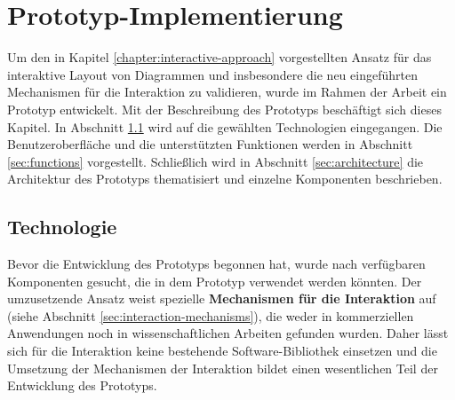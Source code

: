 
\chapter{Prototyp-Implementierung}
\label{chapter:prototype}

Um den in Kapitel \ref{chapter:interactive-approach} vorgestellten Ansatz für das interaktive Layout von Diagrammen und insbesondere die neu eingeführten Mechanismen für die Interaktion zu validieren, wurde im Rahmen der Arbeit ein Prototyp entwickelt. Mit der Beschreibung des Prototyps beschäftigt sich dieses Kapitel. In Abschnitt \ref{sec:technologies} wird auf die gewählten Technologien eingegangen. Die Benutzeroberfläche und die unterstützten Funktionen werden in Abschnitt \ref{sec:functions} vorgestellt. Schließlich wird in Abschnitt \ref{sec:architecture} die Architektur des Prototyps thematisiert und einzelne Komponenten beschrieben.

\section{Technologie}
\label{sec:technologies}

Bevor die Entwicklung des Prototyps begonnen hat, wurde nach verfügbaren Komponenten gesucht, die in dem Prototyp verwendet werden könnten. Der umzusetzende Ansatz weist spezielle \textbf{Mechanismen für die Interaktion} auf (siehe Abschnitt \ref{sec:interaction-mechanisms}), die weder in kommerziellen Anwendungen noch in wissenschaftlichen Arbeiten gefunden wurden. Daher lässt sich für die Interaktion keine bestehende Software-Bibliothek einsetzen und die Umsetzung der Mechanismen der Interaktion bildet einen wesentlichen Teil der Entwicklung des Prototyps.

